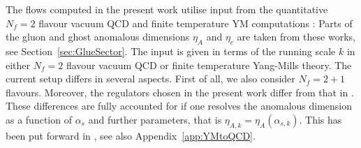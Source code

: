\documentclass[%
reprint,
superscriptaddress,
showpacs,preprintnumbers,
 amsmath,amssymb,
 aps,
prd,
]{revtex4-1}
\def\sec#1{Section~\ref{#1}}
\def\app#1{Appendix~\ref{#1}}
\begin{document}
The flows computed in the present work utilise input from the
quantitative $N_f=2$ flavour vacuum QCD \cite{Cyrol:2017ewj} and
finite temperature YM computations \cite{Cyrol:2017qkl}: Parts of the
gluon and ghost anomalous dimensions $\eta_{A}$ and $\eta_{c}$ are
taken from these works, see \sec{sec:GlueSector}. The input is given
in terms of the running scale $k$ in either $N_f=2$ flavour vacuum QCD
or finite temperature Yang-Mills theory. The current setup differs in
several aspects. First of all, we also consider $N_f=2+1$
flavours. Moreover, the regulators chosen in the present work differ
from that in \cite{Cyrol:2017ewj,Cyrol:2017qkl}. These differences are
fully accounted for if one resolves the anomalous dimension as a
function of $\alpha_{s}$ and further parameters, that is
$\eta_{A,k}=\eta_A(\alpha_{s,k})$. This has been put forward in
\cite{Braun:2014ata,Rennecke:2015}, see also \app{app:YMtoQCD}.
\end{document}
